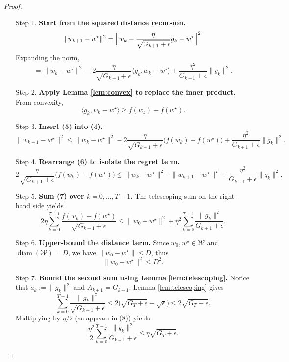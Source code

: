 \documentclass[11pt]{article}
\begin{document}
\begin{proof}
\begin{enumerate}
\item[Step 1.] \textbf{Start from the squared distance recursion.}
\[
\|w_{k+1}-w^{\star}\|^{2}
= \Bigl\|w_k -\frac{\eta}{\sqrt{G_{k+1}+\epsilon}}g_k - w^{\star}\Bigr\|^{2}
\]
Expanding the norm,
\[
= \|w_k-w^{\star}\|^{2}
-2\frac{\eta}{\sqrt{G_{k+1}+\epsilon}}\langle g_k, w_k-w^{\star}\rangle
+\frac{\eta^{2}}{G_{k+1}+\epsilon}\|g_k\|^{2}.
\tag{4}
\]

\item[Step 2.] \textbf{Apply Lemma \ref{lem:convex} to replace the inner product.}
From convexity,
\[
\langle g_k, w_k-w^{\star}\rangle
\ge f(w_k)-f(w^{\star}).
\tag{5}
\]

\item[Step 3.] \textbf{Insert (5) into (4).}
\[
\|w_{k+1}-w^{\star}\|^{2}
\le \|w_k-w^{\star}\|^{2}
-2\frac{\eta}{\sqrt{G_{k+1}+\epsilon}}\bigl(f(w_k)-f(w^{\star})\bigr)
+\frac{\eta^{2}}{G_{k+1}+\epsilon}\|g_k\|^{2}.
\tag{6}
\]

\item[Step 4.] \textbf{Rearrange (6) to isolate the regret term.}
\[
2\frac{\eta}{\sqrt{G_{k+1}+\epsilon}}\bigl(f(w_k)-f(w^{\star})\bigr)
\le
\|w_k-w^{\star}\|^{2}-\|w_{k+1}-w^{\star}\|^{2}
+\frac{\eta^{2}}{G_{k+1}+\epsilon}\|g_k\|^{2}.
\tag{7}
\]

\item[Step 5.] \textbf{Sum (7) over $k=0,\dots,T-1$.}
The telescoping sum on the right-hand side yields
\[
2\eta\sum_{k=0}^{T-1}\frac{f(w_k)-f(w^{\star})}{\sqrt{G_{k+1}+\epsilon}}
\le
\|w_0-w^{\star}\|^{2}
+\eta^{2}\sum_{k=0}^{T-1}\frac{\|g_k\|^{2}}{G_{k+1}+\epsilon}.
\tag{8}
\]

\item[Step 6.] \textbf{Upper‑bound the distance term.}
Since $w_0,w^{\star}\in\mathcal{W}$ and $\operatorname{diam}(\mathcal{W})=D$, we have $\|w_0-w^{\star}\|\le D$, thus
\[
\|w_0-w^{\star}\|^{2}\le D^{2}.
\tag{9}
\]

\item[Step 7.] \textbf{Bound the second sum using Lemma \ref{lem:telescoping}.}
Notice that $a_k:=\|g_k\|^{2}$ and $A_{k+1}=G_{k+1}$. Lemma \ref{lem:telescoping} gives
\[
\sum_{k=0}^{T-1}\frac{\|g_k\|^{2}}{\sqrt{G_{k+1}+\epsilon}}
\le
2\bigl(\sqrt{G_T+\epsilon}-\sqrt{\epsilon}\bigr)
\le
2\sqrt{G_T+\epsilon}.
\tag{10}
\]
Multiplying by $\eta/2$ (as appears in (8)) yields
\[
\frac{\eta^{2}}{2}\sum_{k=0}^{T-1}\frac{\|g_k\|^{2}}{G_{k+1}+\epsilon}
\le
\eta\sqrt{G_T+\epsilon}.
\tag{11}
\]


\end{enumerate}
\end{proof}
\end{document}
